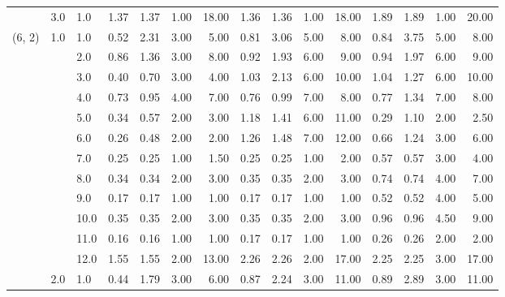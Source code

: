 \begin{tabular}{lllrrrrrrrrrrrr}
       & 3.0 & 1.0  &       1.37 &      1.37 & 1.00 &  18.00 &       1.36 &      1.36 &  1.00 &  18.00 &       1.89 &      1.89 &  1.00 &  20.00 \\
(6, 2) & 1.0 & 1.0  &       0.52 &      2.31 & 3.00 &   5.00 &       0.81 &      3.06 &  5.00 &   8.00 &       0.84 &      3.75 &  5.00 &   8.00 \\
       &     & 2.0  &       0.86 &      1.36 & 3.00 &   8.00 &       0.92 &      1.93 &  6.00 &   9.00 &       0.94 &      1.97 &  6.00 &   9.00 \\
       &     & 3.0  &       0.40 &      0.70 & 3.00 &   4.00 &       1.03 &      2.13 &  6.00 &  10.00 &       1.04 &      1.27 &  6.00 &  10.00 \\
       &     & 4.0  &       0.73 &      0.95 & 4.00 &   7.00 &       0.76 &      0.99 &  7.00 &   8.00 &       0.77 &      1.34 &  7.00 &   8.00 \\
       &     & 5.0  &       0.34 &      0.57 & 2.00 &   3.00 &       1.18 &      1.41 &  6.00 &  11.00 &       0.29 &      1.10 &  2.00 &   2.50 \\
       &     & 6.0  &       0.26 &      0.48 & 2.00 &   2.00 &       1.26 &      1.48 &  7.00 &  12.00 &       0.66 &      1.24 &  3.00 &   6.00 \\
       &     & 7.0  &       0.25 &      0.25 & 1.00 &   1.50 &       0.25 &      0.25 &  1.00 &   2.00 &       0.57 &      0.57 &  3.00 &   4.00 \\
       &     & 8.0  &       0.34 &      0.34 & 2.00 &   3.00 &       0.35 &      0.35 &  2.00 &   3.00 &       0.74 &      0.74 &  4.00 &   7.00 \\
       &     & 9.0  &       0.17 &      0.17 & 1.00 &   1.00 &       0.17 &      0.17 &  1.00 &   1.00 &       0.52 &      0.52 &  4.00 &   5.00 \\
       &     & 10.0 &       0.35 &      0.35 & 2.00 &   3.00 &       0.35 &      0.35 &  2.00 &   3.00 &       0.96 &      0.96 &  4.50 &   9.00 \\
       &     & 11.0 &       0.16 &      0.16 & 1.00 &   1.00 &       0.17 &      0.17 &  1.00 &   1.00 &       0.26 &      0.26 &  2.00 &   2.00 \\
       &     & 12.0 &       1.55 &      1.55 & 2.00 &  13.00 &       2.26 &      2.26 &  2.00 &  17.00 &       2.25 &      2.25 &  3.00 &  17.00 \\
       & 2.0 & 1.0  &       0.44 &      1.79 & 3.00 &   6.00 &       0.87 &      2.24 &  3.00 &  11.00 &       0.89 &      2.89 &  3.00 &  11.00 \\

\end{tabular}
